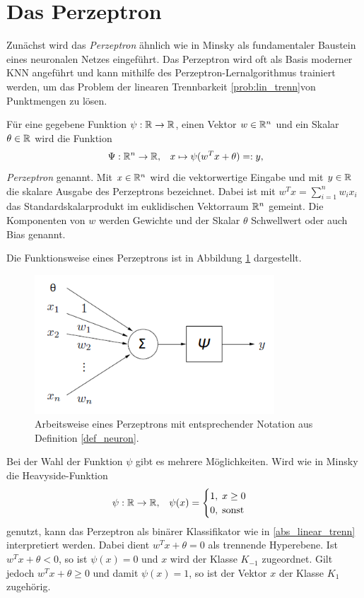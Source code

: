 \section{Das Perzeptron}
\label{perzeptron_abs}
Zunächst wird das \textit{Perzeptron} ähnlich wie in Minsky \cite{minsky2017perceptrons} als fundamentaler Baustein eines neuronalen Netzes eingeführt. Das Perzeptron wird oft als Basis moderner KNN angeführt und kann mithilfe des Perzeptron-Lernalgorithmus\cite{rosenblatt1958perceptron} trainiert werden, um das Problem der linearen Trennbarkeit \ref{prob:lin_trenn}von Punktmengen zu lösen.
\begin{defi}[Perzeptron]
    \label{def_neuron}
    Für eine gegebene Funktion $\psi: \mathbb{R} \rightarrow \mathbb{R}$, einen Vektor $w \in \mathbb{R}^{n}$ und ein Skalar $\theta \in \mathbb{R}$ wird die Funktion 
    \[ \
    \Psi: \mathbb{R}^n \rightarrow \mathbb{R}, \; \; \; x \mapsto \psi(w^T x +\theta)=:y,
    \]
    \textit{Perzeptron} genannt. Mit $x \in \mathbb{R}^{n}$ wird die vektorwertige Eingabe und mit $y \in \mathbb{R}$ die skalare Ausgabe des Perzeptrons bezeichnet. Dabei ist mit $w^Tx=\sum_{i=1}^n w_i x_i$ das Standardskalarprodukt im euklidischen Vektorraum $\mathbb{R}^{n}$ gemeint. Die Komponenten von $w$ werden Gewichte und der Skalar $\theta$ Schwellwert oder auch Bias genannt.
\end{defi}
Die Funktionsweise eines Perzeptrons ist in Abbildung \ref{funktionsweise_neuron} dargestellt.
\begin{figure}[h]
    \includegraphics[width=0.8\textwidth]{pics/chapter_neuralnetworks/perzeptron.png}
    \centering
    \caption{Arbeitsweise eines Perzeptrons mit entsprechender Notation aus Definition \ref{def_neuron}.}
    \label{funktionsweise_neuron}
\end{figure}
Bei der Wahl der Funktion $\psi$ gibt es mehrere Möglichkeiten. Wird wie in Minsky\cite{minsky2017perceptrons} die Heavyside-Funktion
\begin{equation*}
    \psi: \mathbb{R} \rightarrow \mathbb{R}, \; \; \;
    \psi(x)=\begin{cases}
       1 , \; x \geq 0 \\
       0 , \; \text{sonst}
    \end{cases}
\end{equation*} 
genutzt, kann das Perzeptron als binärer Klassifikator wie in \ref{abs_linear_trenn} interpretiert werden. Dabei dient $w^Tx+\theta=0$ als trennende Hyperebene. Ist $w^Tx+\theta<0$, so ist $\psi(x)=0$ und $x$ wird der Klasse $K_{-1}$ zugeordnet. Gilt jedoch $w^Tx+\theta \geq 0$ und damit $\psi(x)=1$, so ist der Vektor $x$ der Klasse $K_1$ zugehörig. 

